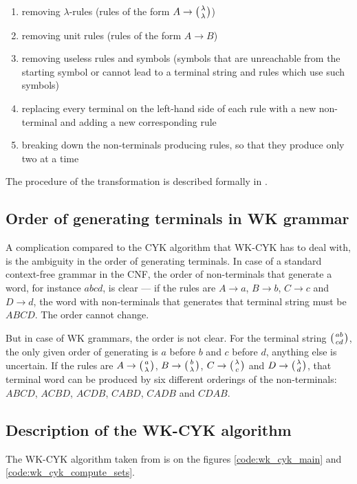\begin{enumerate}
  \item{removing $\lambda$-rules (rules of the form $A \rightarrow \wkpair{\lambda}{\lambda}$)}
  \item{removing unit rules (rules of the form $A \rightarrow B$)}
  \item{removing useless rules and symbols (symbols that are unreachable from the starting symbol or cannot lead to a terminal string and rules which use such symbols)}
  \item{replacing every terminal on the left-hand side of each rule with a new non-terminal and adding a new corresponding rule}
  \item{breaking down the non-terminals producing rules, so that they produce only two at a time}
\end{enumerate}

The procedure of the transformation is described formally in \cite{WK_CYK}.


\subsection{Order of generating terminals in WK grammar}

A complication compared to the CYK algorithm that WK-CYK has to deal with, is the ambiguity in the order of generating terminals. In case of a standard context-free grammar in the CNF, the order of non-terminals that generate a word, for instance $abcd$, is clear --- if the rules are $A \rightarrow a$, $B \rightarrow b$, $C \rightarrow c$ and $D \rightarrow d$, the word with non-terminals that generates that terminal string must be $ABCD$. The order cannot change.

But in case of WK grammars, the order is not clear. For the terminal string $\wkpair{ab}{cd}$, the only given order of generating is $a$ before $b$ and $c$ before $d$, anything else is uncertain. If the rules are $A \rightarrow \wkpair{a}{\lambda}$, $B \rightarrow \wkpair{b}{\lambda}$, $C \rightarrow \wkpair{\lambda}{c}$ and $D \rightarrow \wkpair{\lambda}{d}$, that terminal word can be produced by six different orderings of the non-terminals:
$ABCD$, $ACBD$, $ACDB$, $CABD$, $CADB$ and $CDAB$.

\subsection{Description of the WK-CYK algorithm}
The WK-CYK algorithm taken from \cite{WK_CYK} is on the figures \ref{code:wk_cyk_main} and \ref{code:wk_cyk_compute_sets}.


